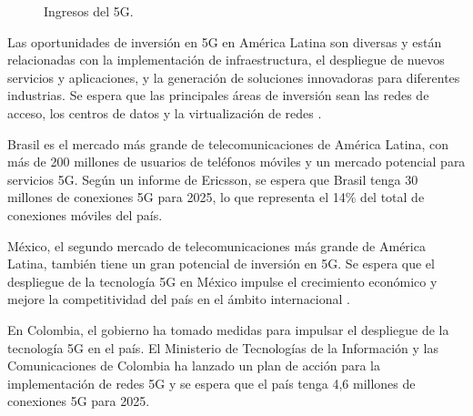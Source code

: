 \documentclass[12pt]{article}
\begin{document}
            \begin{figure}[!h]
                \centering
                \caption{Ingresos del 5G.}
                \label{fig:ingresos5G}
            \end{figure}
            
            Las oportunidades de inversión en 5G en América Latina son diversas y están relacionadas con la implementación de infraestructura, el despliegue de nuevos servicios y aplicaciones, y la generación de soluciones innovadoras para diferentes industrias. Se espera que las principales áreas de inversión sean las redes de acceso, los centros de datos y la virtualización de redes \cite{garcia2018escenarios}.
            
            Brasil es el mercado más grande de telecomunicaciones de América Latina, con más de 200 millones de usuarios de teléfonos móviles y un mercado potencial para servicios 5G. Según un informe de Ericsson, se espera que Brasil tenga 30 millones de conexiones 5G para 2025, lo que representa el 14\% del total de conexiones móviles del país.
            
            México, el segundo mercado de telecomunicaciones más grande de América Latina, también tiene un gran potencial de inversión en 5G. Se espera que el despliegue de la tecnología 5G en México impulse el crecimiento económico y mejore la competitividad del país en el ámbito internacional \cite{monroy2020análisis}.
            
            En Colombia, el gobierno ha tomado medidas para impulsar el despliegue de la tecnología 5G en el país. El Ministerio de Tecnologías de la Información y las Comunicaciones de Colombia ha lanzado un plan de acción para la implementación de redes 5G y se espera que el país tenga 4,6 millones de conexiones 5G para 2025.
            
\end{document}
